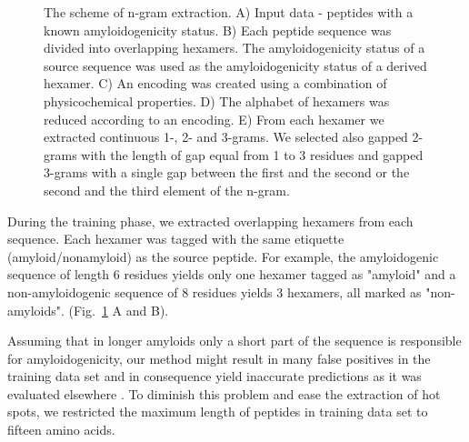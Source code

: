 \documentclass[a4,center,fleqn]{NAR}
\begin{document}
\begin{figure}[!tpb]
  \caption{The scheme of n-gram extraction. 
A) Input data - peptides with a known amyloidogenicity status. 
B) Each peptide sequence was divided into overlapping hexamers. 
The amyloidogenicity status of a source sequence was used 
as the amyloidogenicity status of a derived hexamer. 
C) An encoding was created using a combination of physicochemical properties.
D) The alphabet of hexamers was reduced according to an encoding.
E) From each hexamer we extracted continuous 1-, 2- and 3-grams. We selected also gapped 2-grams with 
the length of gap equal from 1 to 3 residues and gapped 3-grams with a single 
gap between the first and the second or the second and the third element of the 
n-gram.}
\label{fig:ngram_scheme}
\end{figure}

  During the training phase, we extracted overlapping hexamers from each sequence. 
%
%
%
Each hexamer was tagged with the same etiquette (amyloid/nonamyloid) as the 
source peptide. For example, the amyloidogenic sequence of length 6 residues 
yields only one 
%
%
%
%
%
%
%
%
%
hexamer tagged as "amyloid" and a non-amyloidogenic sequence of 8 residues yields 
3 hexamers, all marked as "non-amyloids". (Fig.~\ref{fig:ngram_scheme} A and B). 

  Assuming that in longer amyloids only a short part of the sequence is 
responsible for amyloidogenicity, our method might result in many false 
positives in the training data set and in consequence yield inaccurate 
predictions as it was evaluated elsewhere \citep{kotulska_amyloid_2013}. To 
diminish this problem and ease the extraction of hot spots, we restricted the 
maximum length of peptides in training data set to fifteen amino acids.

%
%
%
\end{document}

